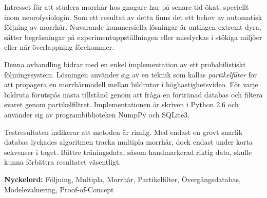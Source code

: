 
Intresset för att studera morrhår hos gnagare har på senare tid ökat, speciellt inom neurofysiologin.
Som ett resultat av detta finns det ett behov av automatisk följning av morrhår.
Nuvarande kommersiella lösningar är antingen extremt dyra, sätter begräsningar på experimentuppställningen
eller misslyckas i stökiga miljöer eller när överlappning förekommer.

Denna avhandling bidrar med en enkel implementation av ett probabilistiskt följningssystem. 
Lösningen använder sig av 
en teknik som kallas \emph{partikelfilter} för att propagera en morrhårmodell mellan bildrutor 
i höghastighetsvideo.
För varje bildruta förutspås nästa tillstånd genom att fråga en förtränad databas 
och filtera svaret genom partikelfiltret. 
Implementationen är skriven i Python 2.6 och använder sig av programbiblioteken NumpPy och SQLite3.

Testresultaten indikerar att metoden är rimlig. 
Med endast en grovt snarlik databas lyckades algoritmen 
tracka multipla morrhår, dock endast under korta sekvenser i taget. 
Bättre träningsdata, såsom handmarkerad riktig data, skulle kunna förbättra resultatet väsentligt.


\textbf{Nyckelord:} Följning, Multipla, Morrhår, Partikelfilter, Övergångsdatabas, Modelevaluering, Proof-of-Concept
